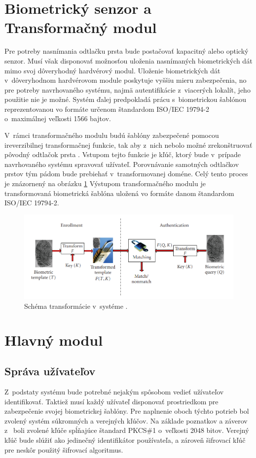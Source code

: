 \section{Biometrický senzor a Transformačný modul}
Pre potreby nasnímania odtlačku prsta bude postačovať kapacitný alebo optický senzor. Musí však disponovať možnosťou uloženia nasnímaných biometrických dát mimo svoj dôveryhodný hardvérový modul. Uloženie biometrických dát v~dôveryhodnom hardvérovom module poskytuje vyššiu mieru zabezpečenia, no pre potreby navrhovaného systému, najmä autentifikácie z~viacerých lokalít, jeho použitie nie je možné. Systém ďalej predpokladá prácu s~biometrickou šablónou reprezentovanou vo formáte určenom štandardom ISO/IEC 19794-2 \cite{ISO19794-2} o~maximálnej veľkosti 1566 bajtov.

V~rámci transformačného modulu budú šablóny zabezpečené pomocou ireverzibilnej transformačnej funkcie, tak aby z~nich nebolo možné zrekonštruovať pôvodný odtlačok prsta \cite{template_transform}. Vstupom tejto funkcie je kľúč, ktorý bude v~prípade navrhovaného systému spravovať užívateľ. Porovnávanie samotných odtlačkov prstov tým pádom bude prebiehať v~transformovanej doméne. Celý tento proces je znázornený na obrázku \ref{pic_transform} Výstupom transformačného modulu je transformovaná biometrická šablóna uložená vo formáte danom štandardom ISO/IEC 19794-2.

\begin{figure}[hbt]
	\centering
	\includegraphics[width=\textwidth]{obrazky-figures/transform.png}
	\caption{Schéma transformácie v~systéme \cite{template_security}.}
	\label{pic_transform}
\end{figure}

\section{Hlavný modul}

\subsection{Správa užívateľov}
Z~podstaty systému bude potrebné nejakým spôsobom vedieť užívateľov identifikovať. Taktiež musí každý užívateľ disponovať prostriedkom pre zabezpečenie svojej biometrickej šablóny. Pre naplnenie oboch týchto potrieb bol zvolený systém súkromných a verejných kľúčov. Na základe poznatkov a záverov z~\cite{keyselect} boli zvolené kľúče spĺňajúce štandard PKCS\#1 o~veľkosti 2048 bitov. Verejný kľúč bude slúžiť ako jedinečný identifikátor používateľa, a zároveň šifrovací kľúč pre neskôr použitý šifrovací algoritmus.


